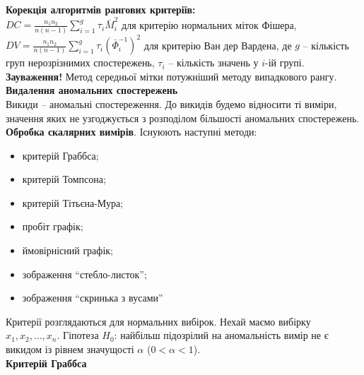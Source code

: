 \textbf{Корекція алгоритмів рангових критеріїв:} \\

$DC = \frac{n_1 n_2}{n(n-1)} \sum_{i=1}^g \tau_i \bar{M}_i^2$ для критерію нормальних міток Фішера, $DV = \frac{n_1 n_2}{n(n-1)} \sum_{i=1}^g \tau_i \left( \bar{\Phi}_i^{-1} \right)^2$ для критерію Ван дер Вардена, де $g$ -- кількість груп нерозрізнимих спостережень, $\tau_i$ -- кількість значень у $i$-ій групі. \\

\textbf{Зауваження!} Метод середньої мітки потужніший методу випадкового рангу. \\

\textbf{Видалення аномальних спостережень} \\

Викиди -- аномальні спостереження. До викидів будемо відносити ті виміри, значення яких не узгоджується  з розподілом більшості аномальних спостережень. \\

\textbf{Обробка скалярних вимірів}. Існуюють наступні методи:
\begin{itemize}
    \item критерій Граббса;
    
    \item критерій Томпсона;
    
    \item критерій Тітьєна-Мура;
    
    \item пробіт графік;
    
    \item ймовірнісний графік;
    
    \item зображення ``стебло-листок'';
    
    \item зображення ``скринька з вусами''
\end{itemize}

Критерії розглядаються для нормальних вибірок. Нехай маємо вибірку $x_1, x_2, \ldots, x_n$. Гіпотеза $H_0$: найбільш підозрілий на аномальність вимір не є викидом із рівнем значущості $\alpha$ ($0 < \alpha < 1$). \\

\textbf{Критерій Граббса} \\ 


